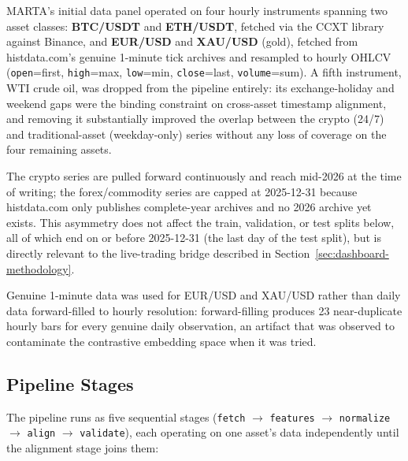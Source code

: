 MARTA's initial data panel operated on four hourly instruments spanning two asset classes: \textbf{BTC/USDT} and \textbf{ETH/USDT}, fetched via the CCXT library against Binance, and \textbf{EUR/USD} and \textbf{XAU/USD} (gold), fetched from histdata.com's genuine 1-minute tick archives and resampled to hourly OHLCV (\texttt{open}=first, \texttt{high}=max, \texttt{low}=min, \texttt{close}=last, \texttt{volume}=sum). A fifth instrument, WTI crude oil, was dropped from the pipeline entirely: its exchange-holiday and weekend gaps were the binding constraint on cross-asset timestamp alignment, and removing it substantially improved the overlap between the crypto (24/7) and traditional-asset (weekday-only) series without any loss of coverage on the four remaining assets.

The crypto series are pulled forward continuously and reach mid-2026 at the time of writing; the forex/commodity series are capped at 2025-12-31 because histdata.com only publishes complete-year archives and no 2026 archive yet exists. This asymmetry does not affect the train, validation, or test splits below, all of which end on or before 2025-12-31 (the last day of the test split), but is directly relevant to the live-trading bridge described in Section~\ref{sec:dashboard-methodology}.

Genuine 1-minute data was used for EUR/USD and XAU/USD rather than daily data forward-filled to hourly resolution: forward-filling produces 23 near-duplicate hourly bars for every genuine daily observation, an artifact that was observed to contaminate the contrastive embedding space when it was tried.

\subsection{Pipeline Stages}
\label{subsec:pipeline-stages}

The pipeline runs as five sequential stages (\texttt{fetch} $\rightarrow$ \texttt{features} $\rightarrow$ \texttt{normalize} $\rightarrow$ \texttt{align} $\rightarrow$ \texttt{validate}), each operating on one asset's data independently until the alignment stage joins them:

